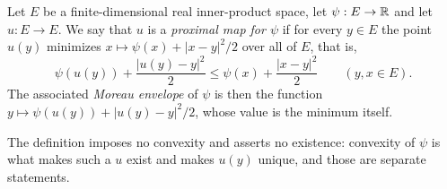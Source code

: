 \begin{definition}
Let $E$ be a finite-dimensional real inner-product space, let $\psi:E\to\mathbb{R}$ and
let $u:E\to E$. We say that $u$ is a \emph{proximal map for $\psi$} if for every
$y\in E$ the point $u(y)$ minimizes $x\mapsto\psi(x)+|x-y|^2/2$ over all of $E$,
that is,
\[
  \psi(u(y))+\frac{|u(y)-y|^2}{2}\le\psi(x)+\frac{|x-y|^2}{2}
  \qquad(y,x\in E).
\]
The associated \emph{Moreau envelope} of $\psi$ is then the function
$y\mapsto\psi(u(y))+|u(y)-y|^2/2$, whose value is the minimum itself.

The definition imposes no convexity and asserts no existence: convexity of
$\psi$ is what makes such a $u$ exist and makes $u(y)$ unique, and those are
separate statements.
\end{definition}
